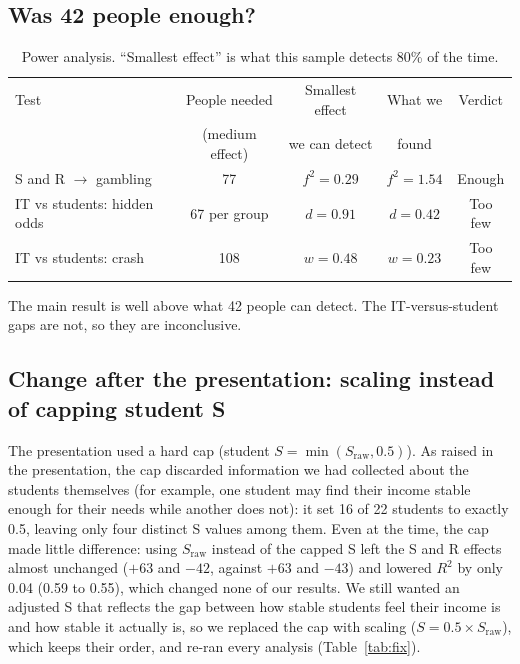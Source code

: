 \documentclass[10pt,a4paper]{article}
\newcommand{\Sraw}{S_{\text{raw}}}
\begin{document}
\subsection{Was 42 people enough?}

\begin{table}[H]
\centering\small
\begin{tabular}{lcccc}
\toprule
Test & People needed & Smallest effect & What we & Verdict \\
 & (medium effect) & we can detect & found & \\
\midrule
S and R $\rightarrow$ gambling & 77 & $f^2 = 0.29$ & $f^2 = 1.54$ & Enough \\
IT vs students: hidden odds & 67 per group & $d = 0.91$ & $d = 0.42$ & Too few \\
IT vs students: crash & 108 & $w = 0.48$ & $w = 0.23$ & Too few \\
\bottomrule
\end{tabular}
\caption{Power analysis. ``Smallest effect'' is what this sample detects 80\% of the time.}
\label{tab:power}
\end{table}

The main result is well above what 42 people can detect. The IT-versus-student gaps are not, so they are inconclusive.

\subsection{Change after the presentation: scaling instead of capping student S}
\label{sec:fix}
The presentation used a hard cap (student $S = \min(\Sraw, 0.5)$). As raised in the presentation, the cap discarded information we had collected about the students themselves (for example, one student may find their income stable enough for their needs while another does not): it set 16 of 22 students to exactly 0.5, leaving only four distinct S values among them. Even at the time, the cap made little difference: using $\Sraw$ instead of the capped S left the S and R effects almost unchanged ($+63$ and $-42$, against $+63$ and $-43$) and lowered $R^2$ by only 0.04 (0.59 to 0.55), which changed none of our results. We still wanted an adjusted S that reflects the gap between how stable students feel their income is and how stable it actually is, so we replaced the cap with scaling ($S = 0.5 \times \Sraw$), which keeps their order, and re-ran every analysis (Table~\ref{tab:fix}).
\end{document}
